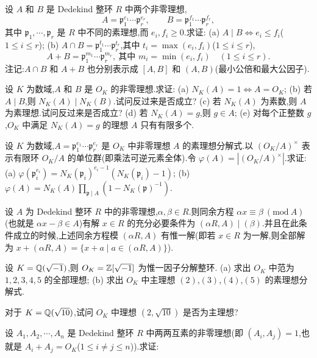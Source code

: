 \begin{Exercises}
  \item 设 $A$ 和 $B$ 是 Dedekind 整环 $R$ 中两个非零理想,
        \[
          A=\mathfrak{p}_1^{e_1}\cdots\mathfrak{p}_r^{e_r},\qquad
          B=\mathfrak{p}_1^{f_1}\cdots\mathfrak{p}_r^{f_r},
        \]
        其中 $\mathfrak{p}_1,\cdots,\mathfrak{p}_r$ 是 $R$ 中不同的素理想,而 $e_i,f_i\geqslant 0$.求证:
        (a) $A\mid B\Leftrightarrow e_i\leqslant f_i$($1\leqslant i\leqslant r$);
        (b) $A\cap B=\mathfrak{p}_1^{t_1}\cdots\mathfrak{p}_r^{t_r}$,其中 $t_i=\max(e_i,f_i)$($1\leqslant i\leqslant r$),
        \[
          A+B=\mathfrak{p}_1^{m_1}\cdots\mathfrak{p}_r^{m_r},\ \text{其中 } m_i=\min(e_i,f_i)\quad (1\leqslant i\leqslant r).
        \]
        注记:$A\cap B$ 和 $A+B$ 也分别表示成 $[A,B]$ 和 $(A,B)$(最小公倍和最大公因子).
  \item 设 $K$ 为数域,$A$ 和 $B$ 是 $O_K$ 的非零理想.求证:
        (a) $N_K(A)=1\Leftrightarrow A=O_K$;
        (b) 若 $A\mid B$,则 $N_K(A)\mid N_K(B)$.试问反过来是否成立?
        (c) 若 $N_K(A)$ 为素数,则 $A$ 为素理想.试问反过来是否成立?
        (d) 若 $N_K(A)=g$,则 $g\in A$;
        (e) 对每个正整数 $g$,$O_K$ 中满足 $N_K(A)=g$ 的理想 $A$ 只有有限多个.
  \item 设 $K$ 为数域,$A=\mathfrak{p}_1^{e_1}\cdots\mathfrak{p}_r^{e_r}$ 是 $O_K$ 中非零理想 $A$ 的素理想分解式.以 $(O_K/A)^{\times}$ 表示有限环 $O_K/A$ 的单位群(即乘法可逆元素全体).令 $\varphi(A)=|(O_K/A)^{\times}|$.求证:
        (a) $\varphi(\mathfrak{p}_i^{e_i})=N_K(\mathfrak{p}_i)^{e_i-1}(N_K(\mathfrak{p}_i)-1)$;
        (b) $\varphi(A)=N_K(A)\prod_{\mathfrak{p}\mid A}(1-N_K(\mathfrak{p})^{-1})$.
  \item 设 $A$ 为 Dedekind 整环 $R$ 中的非零理想,$\alpha,\beta\in R$.则同余方程 $\alpha x\equiv\beta\ (\mathrm{mod}\ A)$(也就是 $\alpha x-\beta\in A$)有解 $x\in R$ 的充分必要条件为 $(\alpha R,A)\mid(\beta)$.并且在此条件成立的时候,上述同余方程模 $(\alpha R,A)$ 有惟一解(即若 $x\in R$ 为一解,则全部解为 $x+(\alpha R,A)=\{x+a\mid a\in(\alpha R,A)\}$).
  \item 设 $K=\mathbb{Q}(\sqrt{-1})$,则 $O_K=\mathbb{Z}[\sqrt{-1}]$ 为惟一因子分解整环.
        (a) 求出 $O_K$ 中范为 $1,2,3,4,5$ 的全部理想;
        (b) 求出 $O_K$ 中主理想 $(2)$,$(3)$,$(4)$,$(5)$ 的素理想分解式.
  \item 对于 $K=\mathbb{Q}(\sqrt{10})$,试问 $O_K$ 中理想 $(2,\sqrt{10})$ 是否为主理想?
  \item 设 $A_1,A_2,\cdots,A_n$ 是 Dedekind 整环 $R$ 中两两互素的非零理想(即 $(A_i,A_j)=1$,也就是 $A_i+A_j=O_K$($1\leqslant i\neq j\leqslant n$)).求证:

\end{Exercises}
